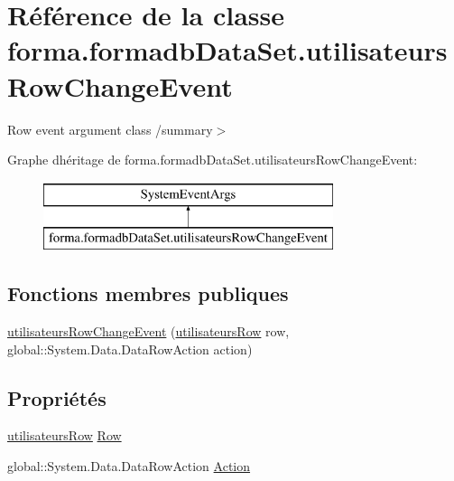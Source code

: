 \hypertarget{classforma_1_1formadb_data_set_1_1utilisateurs_row_change_event}{}\section{Référence de la classe forma.\+formadb\+Data\+Set.\+utilisateurs\+Row\+Change\+Event}
\label{classforma_1_1formadb_data_set_1_1utilisateurs_row_change_event}


Row event argument class /summary$>$  


Graphe d\textquotesingle{}héritage de forma.\+formadb\+Data\+Set.\+utilisateurs\+Row\+Change\+Event\+:\begin{figure}[H]
\begin{center}
\leavevmode
\includegraphics[height=2.000000cm]{classforma_1_1formadb_data_set_1_1utilisateurs_row_change_event}
\end{center}
\end{figure}
\subsection*{Fonctions membres publiques}
\begin{DoxyCompactItemize}
\item 
\hyperlink{classforma_1_1formadb_data_set_1_1utilisateurs_row_change_event_a8f351ad59be6e211206c719f89104efb}{utilisateurs\+Row\+Change\+Event} (\hyperlink{classforma_1_1formadb_data_set_1_1utilisateurs_row}{utilisateurs\+Row} row, global\+::\+System.\+Data.\+Data\+Row\+Action action)
\end{DoxyCompactItemize}
\subsection*{Propriétés}
\begin{DoxyCompactItemize}
\item 
\hyperlink{classforma_1_1formadb_data_set_1_1utilisateurs_row}{utilisateurs\+Row} \hyperlink{classforma_1_1formadb_data_set_1_1utilisateurs_row_change_event_a5902232851085b92452bb961d2bd9626}{Row}
\item 
global\+::\+System.\+Data.\+Data\+Row\+Action \hyperlink{classforma_1_1formadb_data_set_1_1utilisateurs_row_change_event_a6749830b2823bf87ca30888ee58b8d8f}{Action}
\end{DoxyCompactItemize}



